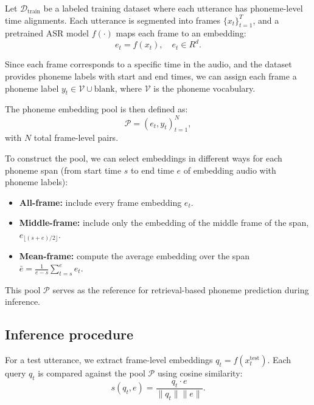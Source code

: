\documentclass{article}
\begin{document}
Let $\mathcal{D}_{\text{train}}$ be a labeled training dataset where each utterance has phoneme-level time alignments.
Each utterance is segmented into frames $\{x_t\}_{t=1}^T$, and a pretrained ASR model $f(\cdot)$ maps each frame to an embedding:
\begin{equation}
e_t = f(x_t), \quad e_t \in R^d.
\end{equation}

Since each frame corresponds to a specific time in the audio, and the dataset provides phoneme labels with start and end times, we can assign each frame a phoneme label $y_t \in \mathcal{V} \cup {\text{blank}}$, where $\mathcal{V}$ is the phoneme vocabulary.

The phoneme embedding pool is then defined as:
\begin{equation}
\mathcal{P} = {(e_t, y_t)}_{t=1}^N,
\end{equation}
with $N$ total frame-level pairs.

To construct the pool, we can select embeddings in different ways for each phoneme span (from start time $s$ to end time $e$ of embedding audio with phoneme labels):

\begin{itemize}
    \item \textbf{All-frame:} include every frame embedding $e_t$.
    \item \textbf{Middle-frame:} include only the embedding of the middle frame of the span, $e_{\lfloor (s+e)/2 \rfloor}$.
    \item \textbf{Mean-frame:} compute the average embedding over the span $\bar{e} = \frac{1}{e-s}\sum_{t=s}^e e_t$.
\end{itemize}

This pool $\mathcal{P}$ serves as the reference for retrieval-based phoneme prediction during inference.


\subsection{Inference procedure}

For a test utterance, we extract frame-level embeddings $q_t = f(x_t^{\text{test}})$.  
Each query $q_t$ is compared against the pool $\mathcal{P}$ using cosine similarity:
\begin{equation}
s(q_t, e) = \frac{q_t \cdot e}{\|q_t\|\|e\|}.
\end{equation}
\end{document}

